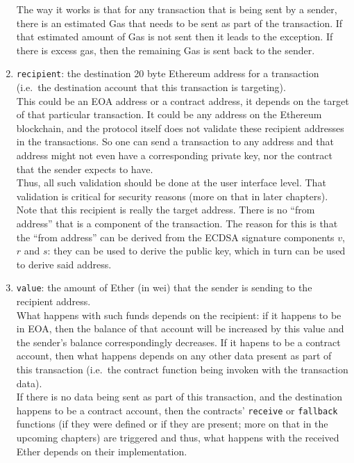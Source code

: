 \begin{enumerate}
  The way it works is that for any transaction that is being sent by a
  sender, there is an estimated Gas that needs to be sent as part of the
  transaction. If that estimated amount of Gas is not sent then it leads
  to the exception. If there is excess gas, then the remaining Gas is
  sent back to the sender.
\item
  \texttt{recipient}: the destination 20 byte Ethereum address for a
  transaction (i.e.~the destination account that this transaction is
  targeting).\\

  This could be an EOA address or a contract address, it depends on the
  target of that particular transaction. It could be any address on the
  Ethereum blockchain, and the protocol itself does not validate these
  recipient addresses in the transactions. So one can send a transaction
  to any address and that address might not even have a corresponding
  private key, nor the contract that the sender expects to have.\\

  Thus, all such validation should be done at the user interface level.
  That validation is critical for security reasons (more on that in
  later chapters). Note that this recipient is really the target
  address. There is no ``from address'' that is a component of the
  transaction. The reason for this is that the ``from address'' can be
  derived from the ECDSA signature components $v$, $r$ and $s$:
  they can be used to derive the public key, which in turn can be used
  to derive said address.
\item
  \texttt{value}: the amount of Ether (in wei) that the sender is
  sending to the recipient address.\\

  What happens with such funds depends on the recipient: if it happens
  to be in EOA, then the balance of that account will be increased by
  this value and the sender's balance correspondingly decreases. If it
  hapens to be a contract account, then what happens depends on any
  other data present as part of this transaction (i.e.~the contract
  function being invoken with the transaction data).\\

  If there is no data being sent as part of this transaction, and the
  destination happens to be a contract account, then the contracts'
  \texttt{receive} or \texttt{fallback} functions (if they were defined
  or if they are present; more on that in the upcoming chapters) are
  triggered and thus, what happens with the received Ether depends on
  their implementation.\\


\end{enumerate}
